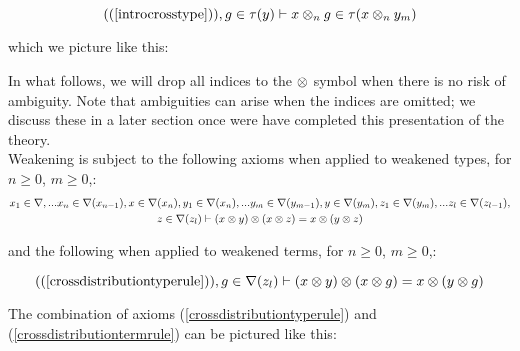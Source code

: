 \documentclass[10pt,a4paper]{article}
\begin{document}
\begin{equation}
\contextof{introcrosstype},\ofT{g}{\trm(y)}
\tstyle 
\ofT{x \cross_n g}{\trm(x \cross_n y_{m})}
 \\
\end{equation}

\noindent which we picture like this:



\vspace{1cm}

\noindent In what follows, we will drop all indices to the $\otimes$ symbol when there is no risk of ambiguity. Note that ambiguities can arise when the indices are omitted; we discuss these in a later section once were have completed this presentation of the theory. \\


\noindent Weakening is subject to the following axioms when applied to weakened types,
for $n \geq 0$, $m \geq 0$,:
\begin{multline}
\label{crossdistributiontyperule}
x_1 \in \nabla,... x_{n} \in \nabla(x_{n-1}),x \in \nabla(x_n),y_1 \in \nabla({x_n}),... y_{m} \in \nabla(y_{m-1}),y \in \nabla(y_m),z_1 \in \nabla({y_m}),... z_{l} \in \nabla(z_{l-1}),\\
z \in \nabla(z_l) 
\vdash  (x \otimes y) \otimes (x \otimes z) = x \otimes (y \otimes z)
\end{multline}

\noindent and the following when applied to weakened terms, for $n \geq 0$, $m \geq 0$,:

\begin{equation}
\label{crossdistributiontermrule}
\contextof{crossdistributiontyperule},\ofT{g}{\typ(z_l)}
\tstyle  (x \cross y) \cross (x \cross g) = x \cross (y \cross g)
\end{equation}
\vspace{0.2cm}

\noindent The combination of axioms (\ref{crossdistributiontyperule}) and 
(\ref{crossdistributiontermrule}) can be pictured like this:
\end{document}
